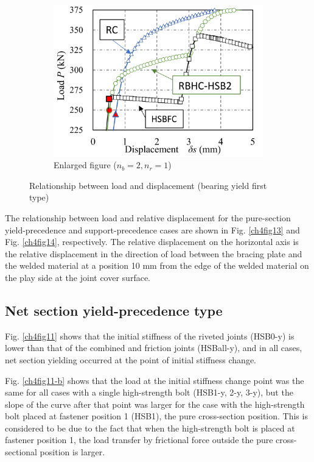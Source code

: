 \begin{figure}
\begin{subfigure}[t]{0.48\textwidth}
    \label{ch4fig12-b}
    \end{subfigure}
    \hfill
    \begin{subfigure}[t]{0.48\textwidth}
    \includegraphics[width=\linewidth]{imgs/ch4/fig12-c.pdf}
    \caption{Enlarged figure ($n_b=2, n_r=1$)}
    \label{ch4fig12-c}
    \end{subfigure}
    \caption{Relationship between load and displacement (bearing yield first type)}
    \label{ch4fig12}
\end{figure}

The relationship between load and relative displacement for the pure-section yield-precedence and support-precedence cases are shown in Fig. \ref{ch4fig13} and Fig. \ref{ch4fig14}, respectively. The relative displacement on the horizontal axis is the relative displacement in the direction of load between the bracing plate and the welded material at a position 10 mm from the edge of the welded material on the play side at the joint cover surface.

\subsection{Net section yield-precedence type}

Fig. \ref{ch4fig11} shows that the initial stiffness of the riveted joints (HSB0-y) is lower than that of the combined and friction joints (HSBall-y), and in all cases, net section yielding occurred at the point of initial stiffness change.

Fig. \ref{ch4fig11-b} shows that the load at the initial stiffness change point was the same for all cases with a single high-strength bolt (HSB1-y, 2-y, 3-y), but the slope of the curve after that point was larger for the case with the high-strength bolt placed at fastener position 1 (HSB1), the pure cross-section position. This is considered to be due to the fact that when the high-strength bolt is placed at fastener position 1, the load transfer by frictional force outside the pure cross-sectional position is larger.

